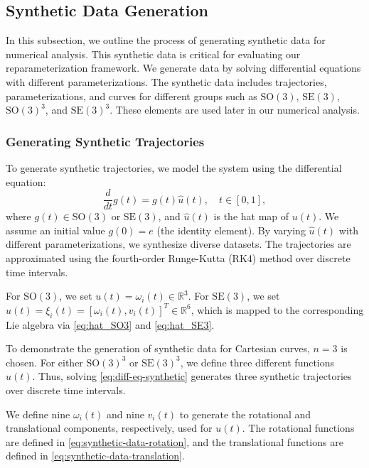 \subsection{Synthetic Data Generation}
\label{subsec:synthetic-data-generation}

In this subsection, we outline the process of generating synthetic data for numerical analysis. This synthetic data is critical for evaluating our reparameterization framework. We generate data by solving differential equations with different parameterizations. The synthetic data includes trajectories, parameterizations, and curves for different groups such as \(\mathrm{SO}(3)\), \(\mathrm{SE}(3)\), \(\mathrm{SO}(3)^3\), and \(\mathrm{SE}(3)^3\). These elements are used later in our numerical analysis.

\subsubsection{Generating Synthetic Trajectories}
\label{subsubsec:synthetic-trajectories-generation}

To generate synthetic trajectories, we model the system using the differential equation:
\begin{equation}
    \frac{d}{dt} g(t) = g(t) \hat{u}(t), \quad t \in [0, 1],
    \label{eq:diff-eq-synthetic}
\end{equation}
where \( g(t) \in \mathrm{SO}(3) \) or \( \mathrm{SE}(3) \), and \(\hat{u}(t)\) is the hat map of \(u(t)\). We assume an initial value \( g(0) = e \) (the identity element). By varying \(\hat{u}(t)\) with different parameterizations, we synthesize diverse datasets. The trajectories are approximated using the fourth-order Runge-Kutta (RK4) method \cite{rungeUeberNumerischeAufloesung1895,butcherCoefficientsStudyRungeKutta1963} over discrete time intervals.

For \(\mathrm{SO}(3)\), we set \(u(t) = \omega_i(t) \in \mathbb{R}^3\). For \(\mathrm{SE}(3)\), we set \(u(t) = \xi_i(t) = [\omega_i(t), v_i(t)]^T \in \mathbb{R}^6\), which is mapped to the corresponding Lie algebra via \eqref{eq:hat_SO3} and \eqref{eq:hat_SE3}.

To demonstrate the generation of synthetic data for Cartesian curves, \(n = 3\) is chosen. For either \(\mathrm{SO}(3)^3\) or \(\mathrm{SE}(3)^3\), we define three different functions \(u(t)\). Thus, solving \eqref{eq:diff-eq-synthetic} generates three synthetic trajectories over discrete time intervals.

We define nine \(\omega_i(t)\) and nine \(v_i(t)\) to generate the rotational and translational components, respectively, used for \(u(t)\). The rotational functions are defined in \eqref{eq:synthetic-data-rotation}, and the translational functions are defined in \eqref{eq:synthetic-data-translation}.

